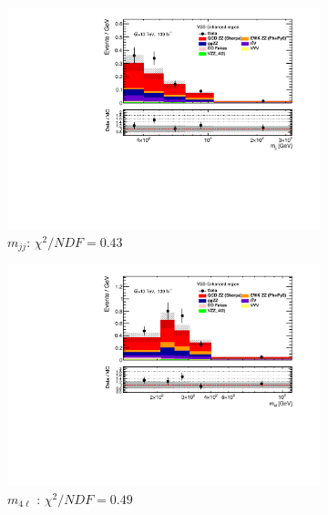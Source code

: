 \begin{figure}[!htb]
    \centering
    \begin{subfigure}{.49\textwidth}
        \centering
        \includegraphics[width=.98\linewidth]{figures/Results/RecoDist_VBSEnhanced/reco_mjj_SR.pdf}
        \caption{ \footnotesize{$m_{jj}$}: $\chi^2/NDF = 0.43$ }
    \end{subfigure}
    \begin{subfigure}{.49\textwidth}
        \centering
        \includegraphics[width=.98\linewidth]{figures/Results/RecoDist_VBSEnhanced/reco_m4l_SR.pdf}
        \caption{ \footnotesize{$m_{4\ell}$ }: $\chi^2/NDF = 0.49$ }
    \end{subfigure}\\
    \begin{subfigure}{.49\textwidth}
        \centering

\end{subfigure}
\end{figure}
